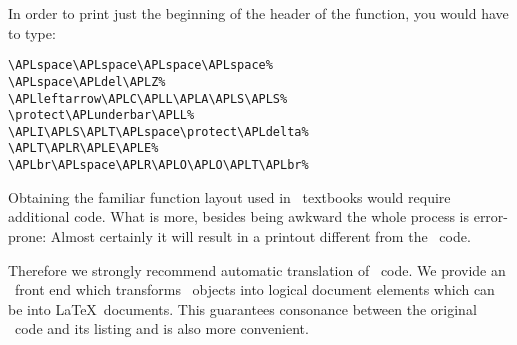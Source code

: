 \begin{APLfns}
\begin{APLfnsline}{\APLleftbracket\APLsix\APLrightbracket}{}
\APLZ\APLleftarrow\APLleftparen\APLleftparen\APLZ\APLiota
\APLZ\APLrightparen\APLequal\APLiota\APLrho\APLZ\APLrightparen
\APLslash\APLZ\APLleftarrow\APLZ\APLcomma\APLuparrow
\APLcomma\APLslash\APLcomma\APLdieresis\APLcomma\APLI
\end{APLfnsline}
\begin{APLfnsline}{\APLleftbracket\APLseven\APLrightbracket}{}
\APLrightarrow\APLzero
\end{APLfnsline}
\begin{APLfnsline}{\APLleftbracket\APLeight\APLrightbracket}{}
\APLC\APLY\APLC\APLL\APLI\APLC\APLcolon\APLZ
\APLleftarrow\APLzero\APLrho\APLzero
\end{APLfnsline}
\begin{APLfnsline}{}{\APLdel}
\end{APLfnsline}
\end{APLfns}

 
In order to print just the beginning of the header of the
function, you would have to type:
 
\begin{verbatim}
\APLspace\APLspace\APLspace\APLspace%
\APLspace\APLdel\APLZ%
\APLleftarrow\APLC\APLL\APLA\APLS\APLS%
\protect\APLunderbar\APLL%
\APLI\APLS\APLT\APLspace\protect\APLdelta%
\APLT\APLR\APLE\APLE%
\APLbr\APLspace\APLR\APLO\APLO\APLT\APLbr%
\end{verbatim}

 
Obtaining the familiar function layout used in \APL\ textbooks
would require additional code. What is more, besides being
awkward the whole process is error-prone: Almost certainly
it will result in a printout different from the \APL\ code.
 
Therefore we strongly recommend automatic translation of \APL\ code.
We provide an \APL\ front end which
transforms \APL\ objects into logical document elements which can be
\verb++ into \LaTeX\ documents. This
guarantees consonance between the original \APL\ code and
its listing and is also more convenient.
 
